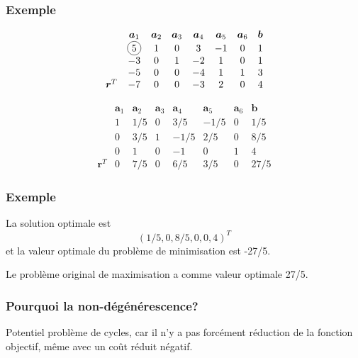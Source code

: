 \documentclass[t,usepdftitle=false]{beamer}
\newcommand*\circled[1]{\tikz[baseline=(char.base)]{
    \node[shape=circle,draw,inner sep=2pt] (char) {#1};}}
\def\ba{\boldsymbol{a}}
\def\bb{\boldsymbol{b}}
\def\br{\boldsymbol{r}}
\begin{document}
\begin{frame}
\frametitle{Exemple}

\[
\begin{matrix}
& \ba_1 & \ba_2 & \ba_3 & \ba_4 & \ba_5 &\ba_6 & \bb \\
& \circled{5} & 1 & 0 & 3 & -1 & 0 & 1 \\
& -3 & 0 & 1 & -2 & 1 & 0 & 1 \\
& -5 & 0 & 0 & -4 & 1 & 1 & 3 \\
\br^T & -7 & 0 & 0 & -3 & 2 & 0 & 4
\end{matrix}
\]

\[
\begin{matrix}
& \ba_1 & \ba_2 & \ba_3 & \ba_4 & \ba_5 &\ba_6 & \bb \\
& 1 & 1/5 & 0 & 3/5 & -1/5 & 0 & 1/5 \\
& 0 & 3/5 & 1 & -1/5 & 2/5 & 0 & 8/5 \\
& 0 & 1 & 0 & -1 & 0 & 1 & 4 \\
\br^T & 0 & 7/5 & 0 & 6/5 & 3/5 & 0 & 27/5
\end{matrix}
\]

\end{frame}

\begin{frame}
\frametitle{Exemple}

La solution optimale est
\[
(1/5, 0, 8/5, 0, 0, 4)^T
\]
et la valeur optimale du problème de minimisation est -27/5.

\mbox{}

Le problème original de maximisation a comme valeur optimale 27/5.

\end{frame}

\begin{frame}
\frametitle{Pourquoi la non-dégénérescence?}

Potentiel problème de cycles, car il n'y a pas forcément réduction de la fonction objectif, même avec un coût réduit négatif.

\end{frame}
\end{document}
